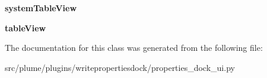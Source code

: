\begin{DoxyCompactItemize}
\item 
{\bfseries system\+Table\+View}\hypertarget{classplume-creator_1_1src_1_1plume_1_1plugins_1_1writepropertiesdock_1_1properties__dock__ui_1_1_ui___write_properties_dock_af14c0f6353dfb6aea991d28e1e698b40}{}\label{classplume-creator_1_1src_1_1plume_1_1plugins_1_1writepropertiesdock_1_1properties__dock__ui_1_1_ui___write_properties_dock_af14c0f6353dfb6aea991d28e1e698b40}

\item 
{\bfseries table\+View}\hypertarget{classplume-creator_1_1src_1_1plume_1_1plugins_1_1writepropertiesdock_1_1properties__dock__ui_1_1_ui___write_properties_dock_ab46f53ccdf0b3e750de9b9fcead42d36}{}\label{classplume-creator_1_1src_1_1plume_1_1plugins_1_1writepropertiesdock_1_1properties__dock__ui_1_1_ui___write_properties_dock_ab46f53ccdf0b3e750de9b9fcead42d36}

\end{DoxyCompactItemize}


The documentation for this class was generated from the following file\+:\begin{DoxyCompactItemize}
\item 
src/plume/plugins/writepropertiesdock/properties\+\_\+dock\+\_\+ui.\+py\end{DoxyCompactItemize}
